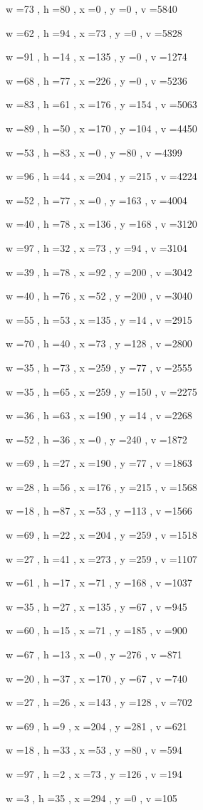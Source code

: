 \documentclass[11pt]{article}
\begin{document}
w =73 , h =80 , x =0 , y =0 , v =5840
\par
w =62 , h =94 , x =73 , y =0 , v =5828
\par
w =91 , h =14 , x =135 , y =0 , v =1274
\par
w =68 , h =77 , x =226 , y =0 , v =5236
\par
w =83 , h =61 , x =176 , y =154 , v =5063
\par
w =89 , h =50 , x =170 , y =104 , v =4450
\par
w =53 , h =83 , x =0 , y =80 , v =4399
\par
w =96 , h =44 , x =204 , y =215 , v =4224
\par
w =52 , h =77 , x =0 , y =163 , v =4004
\par
w =40 , h =78 , x =136 , y =168 , v =3120
\par
w =97 , h =32 , x =73 , y =94 , v =3104
\par
w =39 , h =78 , x =92 , y =200 , v =3042
\par
w =40 , h =76 , x =52 , y =200 , v =3040
\par
w =55 , h =53 , x =135 , y =14 , v =2915
\par
w =70 , h =40 , x =73 , y =128 , v =2800
\par
w =35 , h =73 , x =259 , y =77 , v =2555
\par
w =35 , h =65 , x =259 , y =150 , v =2275
\par
w =36 , h =63 , x =190 , y =14 , v =2268
\par
w =52 , h =36 , x =0 , y =240 , v =1872
\par
w =69 , h =27 , x =190 , y =77 , v =1863
\par
w =28 , h =56 , x =176 , y =215 , v =1568
\par
w =18 , h =87 , x =53 , y =113 , v =1566
\par
w =69 , h =22 , x =204 , y =259 , v =1518
\par
w =27 , h =41 , x =273 , y =259 , v =1107
\par
w =61 , h =17 , x =71 , y =168 , v =1037
\par
w =35 , h =27 , x =135 , y =67 , v =945
\par
w =60 , h =15 , x =71 , y =185 , v =900
\par
w =67 , h =13 , x =0 , y =276 , v =871
\par
w =20 , h =37 , x =170 , y =67 , v =740
\par
w =27 , h =26 , x =143 , y =128 , v =702
\par
w =69 , h =9 , x =204 , y =281 , v =621
\par
w =18 , h =33 , x =53 , y =80 , v =594
\par
w =97 , h =2 , x =73 , y =126 , v =194
\par
w =3 , h =35 , x =294 , y =0 , v =105
\par
\newpage
\end{document}

